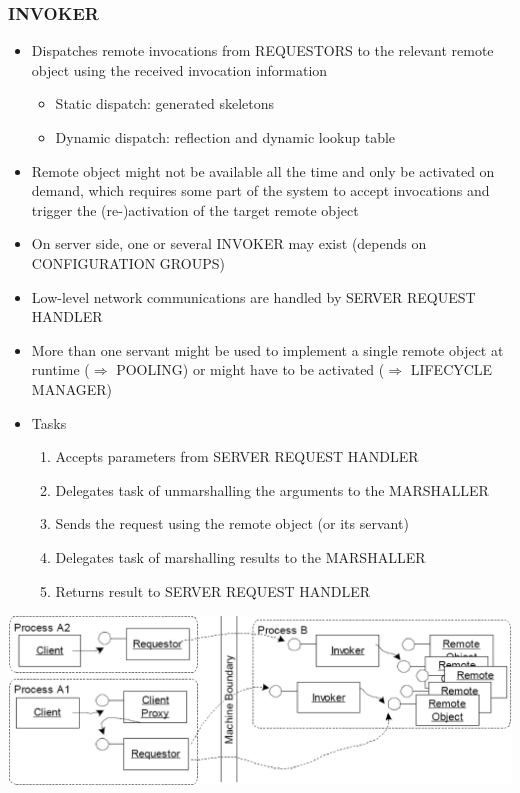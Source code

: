 \documentclass[10pt]{article}
\newcommand{\Ra}{\Rightarrow}
\begin{document}
\subsubsection{INVOKER}
\begin{itemize}
	\item Dispatches remote invocations from REQUESTORS to the relevant remote object using the received invocation information
		\begin{itemize}
			\item Static dispatch: generated skeletons
			\item Dynamic dispatch: reflection and dynamic lookup table
		\end{itemize}
	\item Remote object might not be available all the time and only be activated on demand, which requires some part of the system to accept invocations and trigger the (re-)activation of the target remote object
	\item On server side, one or several INVOKER may exist (depends on CONFIGURATION GROUPS)
	\item Low-level network communications are handled by SERVER REQUEST HANDLER
	\item More than one servant might be used to implement a single remote object at runtime ($\Ra$ POOLING) or might have to be activated ($\Ra$ LIFECYCLE MANAGER)
	\item Tasks
		\begin{enumerate}
			\item Accepts parameters from SERVER REQUEST HANDLER
			\item Delegates task of unmarshalling the arguments to the MARSHALLER
			\item Sends the request using the remote object (or its servant)
			\item Delegates task of marshalling results to the MARSHALLER
			\item Returns result to SERVER REQUEST HANDLER
		\end{enumerate}
\end{itemize}
\begin{center}
	\includegraphics[scale=0.2]{invoker.png}
\end{center}
\end{document}
